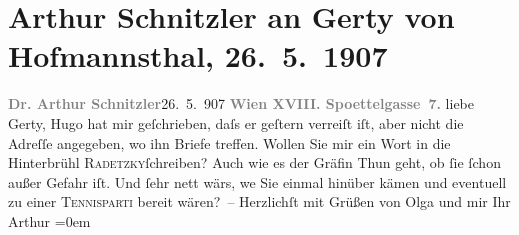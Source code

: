 

         
         \renewcommand{\erwaehntePersonen}{Personen: Hugo von Hofmannsthal, Gertrude von Hofmannsthal, Olga Schnitzler, Christiane von Thun-Hohenstein-Salm-Reifferscheidt}
         \renewcommand{\erwaehnteOrte}{Orte: Edmund-Weiß-Gasse, Hotel Radetzky, Wien}
         \renewcommand{\erwaehnteWerke}{}
               \section[Arthur Schnitzler an Gerty von Hofmannsthal, 26. 5. 1907]{ Arthur Schnitzler an Gerty von Hofmannsthal, 26. 5. 1907}\nopagebreak{}\rehead{ }\begin{ledgroupsized}[t]{13cm}\normalsize\beginnumbering \toendnotes[C]{\smallbreak\pagebreak[2]} 
\pstart
           \noindent{}{\pb}\textcolor{gray}{\textbf{Dr. Arthur Schnitzler}}\hfill 26. 5. 907\pend
           \pstart
           \textcolor{gray}{\textbf{Wien XVIII. Spoettelgasse 7.}}\pend
           \pstart
           liebe Gerty, Hugo hat mir geſchrieben, daſs er geſtern
               verreiſt iſt, aber nicht die Adreſſe angegeben, wo ihn Briefe treffen. Wollen Sie mir
               ein Wort in die Hinterbrühl \textsc{Radetzky}ſchreiben? Auch wie es der Gräfin Thun geht, ob ſie ſchon außer Gefahr iſt. Und ſehr nett {\pb}wärs, we{\geminationn} Sie einmal
               hinüber kämen und eventuell zu einer \textsc{Tennisparti} bereit
               wären? –\pend
           \pstart
           Herzlichſt mit Grüßen von Olga und mir\pend
           \pstart
           Ihr{\\[\baselineskip]}\spacefill\mbox{Arthur}\pend
           \leftskip=0em{}
         
         \endnumbering{}\end{ledgroupsized}  \newcommand{\dateiname}{L01679}\newcommand{\titel}{Arthur Schnitzler an Gerty von Hofmannsthal, 26. 5. 1907}\newcommand{\editorInnen}{Martin Anton Müller und Gerd-Hermann Susen}
      